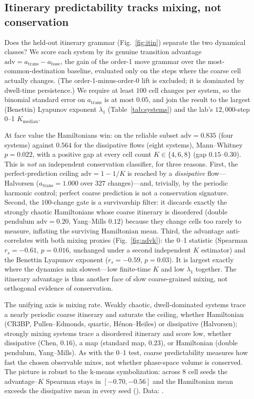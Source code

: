 \documentclass[11pt]{article}
\begin{document}
\subsection{Itinerary predictability tracks mixing, not conservation}
\label{sec:itin-adv}

Does the held-out itinerary grammar (Fig.~\ref{fig:itin}) separate the two
dynamical classes? We score each system by its genuine transition advantage
$\mathrm{adv}=a_{\mathrm{trans}}-a_{\mathrm{base}}$, the gain of the order-1 move
grammar over the most-common-destination baseline, evaluated only on the steps
where the coarse cell actually changes. (The order-1-minus-order-0 lift is
excluded; it is dominated by dwell-time persistence.) We require at least $100$
cell changes per system, so the binomial standard error on $a_{\mathrm{trans}}$
is at most $0.05$, and join the result to the largest (Benettin) Lyapunov
exponent $\lambda_1$ (Table~\ref{tab:systems}) and the lab's $12{,}000$-step
0--1 $K_{\mathrm{median}}$.

At face value the Hamiltonians win: on the reliable subset
$\overline{\mathrm{adv}}=0.835$ (four systems) against $0.564$ for the
dissipative flows (eight systems), Mann--Whitney $p=0.022$, with a positive gap
at every cell count $K\in\{4,6,8\}$ (gap $0.15$--$0.30$). This is \emph{not} an
independent conservation classifier, for three reasons. First, the
perfect-prediction ceiling $\mathrm{adv}=1-1/K$ is reached by a \emph{dissipative}
flow---Halvorsen ($a_{\mathrm{trans}}=1.000$ over $327$ changes)---and, trivially,
by the periodic harmonic control; perfect coarse prediction is not a conservation
signature. Second, the $100$-change gate is a survivorship filter: it discards
exactly the strongly chaotic Hamiltonians whose coarse itinerary is disordered
(double pendulum $\mathrm{adv}=0.20$, Yang--Mills $0.12$) because they change
cells too rarely to measure, inflating the surviving Hamiltonian mean. Third,
the advantage anti-correlates with both mixing proxies (Fig.~\ref{fig:advk}): the 0--1 statistic
(Spearman $r_s=-0.61$, $p=0.016$, unchanged under a second independent $K$
estimator) and the Benettin Lyapunov exponent ($r_s=-0.59$, $p=0.03$). It is
largest exactly where the dynamics mix slowest---low finite-time $K$ and low
$\lambda_1$ together. The itinerary advantage is thus another face of slow
coarse-grained mixing, not orthogonal evidence of conservation.

The unifying axis is mixing rate. Weakly chaotic, dwell-dominated systems trace a
nearly periodic coarse itinerary and saturate the ceiling, whether Hamiltonian
(CR3BP, Pullen--Edmonds, quartic, Hénon--Heiles) or dissipative (Halvorsen);
strongly mixing systems trace a disordered itinerary and score low, whether
dissipative (Chen, $0.16$), a map (standard map, $0.23$), or Hamiltonian (double
pendulum, Yang--Mills). As with the 0--1 test, coarse predictability measures how
fast the chosen observable mixes, not whether phase-space volume is conserved.
The picture is robust to the k-means symbolization: across $8$ cell seeds the
advantage--$K$ Spearman stays in $[-0.70,-0.56]$ and the Hamiltonian mean exceeds
the dissipative mean in every seed ().
Data: .
\end{document}
